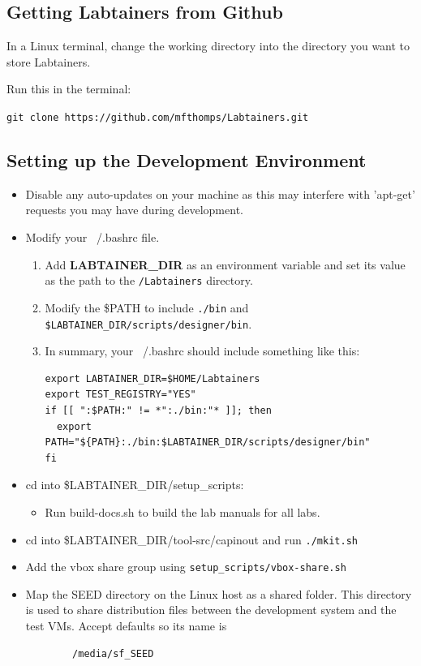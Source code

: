 \documentclass[12pt]{article}
\begin{document}
\subsection{Getting Labtainers from Github}

In a Linux terminal, change the working directory into the directory you want to store Labtainers.
\begin{flushleft} Run this in the terminal: \end{flushleft}
\begin{center} {\tt git clone https://github.com/mfthomps/Labtainers.git} \end{center} 

\subsection{Setting up the Development Environment}
\begin {itemize}
\item Disable any auto-updates on your machine as this may interfere with 'apt-get' requests you may have during development.
\item Modify your ~/.bashrc file.
    \begin{enumerate}
    \item Add {\bf LABTAINER\_DIR} as an environment variable and set its value as the path to the {\tt  /Labtainers} directory. 
    \item Modify the \$PATH to include {\tt ./bin} and {\tt \$LABTAINER\_DIR/scripts/designer/bin}.
    \item In summary, your ~/.bashrc should include something like this:
	    \lstset{basicstyle=\footnotesize\ttfamily,
		    breaklines=true
	    	    framextopmargin=50pt
		    frame=single,
		    language=bash}
	    \begin{mdframed}
	    \begin{lstlisting}
export LABTAINER_DIR=$HOME/Labtainers
export TEST_REGISTRY="YES"
if [[ ":$PATH:" != *":./bin:"* ]]; then
  export PATH="${PATH}:./bin:$LABTAINER_DIR/scripts/designer/bin"
fi
	    \end{lstlisting}
	    \end{mdframed}
    \end{enumerate}
\item cd into \$LABTAINER\_DIR/setup\_scripts:
    \begin{itemize}
    	\item Run build-docs.sh to build the lab manuals for all labs.
    \end{itemize}
\item cd into \$LABTAINER\_DIR/tool-src/capinout and run {\tt ./mkit.sh}
\item Add the vbox share group using {\tt setup\_scripts/vbox-share.sh} 
\item Map the SEED directory on the Linux host as a shared folder. This directory is used
to share distribution files between the development system and the test VMs.  Accept defaults so its name is 
\begin{verbatim}
        /media/sf_SEED
\end{verbatim}
\end {itemize}
\end{document}
